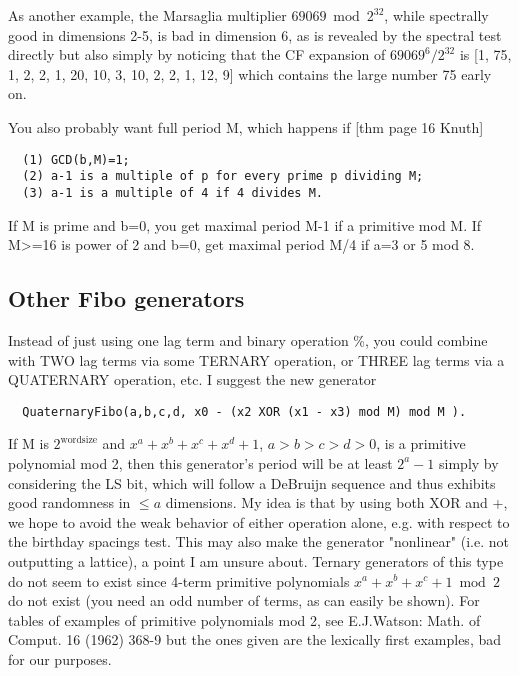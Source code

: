 As another example, the Marsaglia multiplier
$69069 \bmod 2^{32}$, while spectrally good in
dimensions 2-5, is bad in dimension 6, as is revealed by the spectral
test directly but also simply by noticing that the CF expansion of
$69069^6 / 2^{32}$ is [1, 75, 1, 2, 2, 1, 20, 10, 3, 10, 2, 2, 1, 12, 9]
which contains the large number 75 early on.

You also probably want
full period M, which happens if [thm page 16 Knuth]
\begin{verbatim}
  (1) GCD(b,M)=1;
  (2) a-1 is a multiple of p for every prime p dividing M;
  (3) a-1 is a multiple of 4 if 4 divides M.
\end{verbatim}
If M is prime and b=0, you get maximal period M-1 if a primitive mod M.
If M>=16 is power of 2 and b=0, get maximal period M/4 if a=3 or 5 mod 8.

\subsection*{Other Fibo generators}
Instead of just using one lag term and binary operation \%, you could combine
with TWO lag terms via some TERNARY operation, or THREE lag terms
via a QUATERNARY operation, etc. I suggest the new generator
\begin{verbatim}
  QuaternaryFibo(a,b,c,d, x0 - (x2 XOR (x1 - x3) mod M) mod M ).
\end{verbatim}

If M is $2^{\mbox{wordsize}}$ and $x^a+x^b+x^c+x^d+1$, $a>b>c>d>0$,
 is a primitive
polynomial mod 2, then this generator's period will be at least $2^a - 1$
simply by considering the LS bit, which will follow a DeBruijn sequence
and thus exhibits good randomness in $\le a$ dimensions.
My idea is that by using
both XOR and +, we hope to avoid the weak behavior of either operation
alone, e.g. with respect to the birthday spacings test. This may also
make the generator "nonlinear" (i.e. not outputting a lattice), a point
I am unsure about. Ternary generators of this type do not seem to exist since
4-term primitive polynomials $x^a+x^b+x^c+1 \bmod 2$ do not exist (you
need an odd number of terms, as can easily be shown).
For tables of examples of primitive polynomials mod 2, see E.J.Watson: Math. of
Comput. 16 (1962) 368-9 but the ones given are the lexically first examples,
bad for our purposes.

